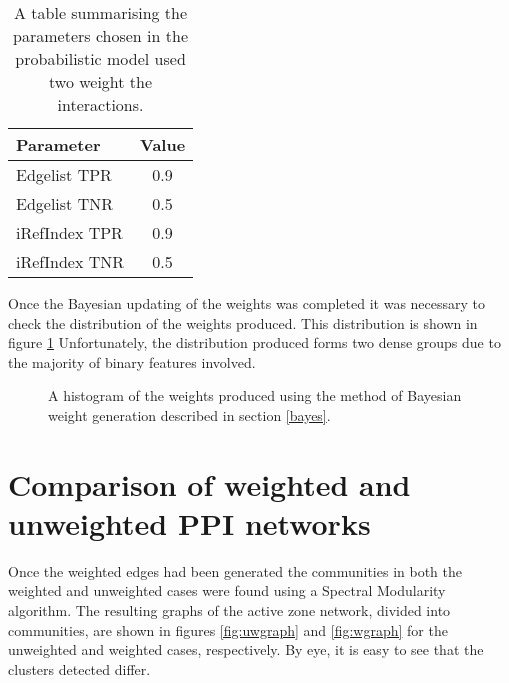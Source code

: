\begin{table}
    \centering
    \begin{tabular}{l c }
        Parameter       & Value \\
        \hline
        Edgelist TPR    & 0.9 \\
        Edgelist TNR    & 0.5 \\
        iRefIndex TPR   & 0.9 \\
        iRefIndex TNR   & 0.5 \\
    \end{tabular}
    \caption{A table summarising the parameters chosen in the probabilistic model used two weight the interactions.}
    \label{tab:estimates}
\end{table}

Once the Bayesian updating of the weights was completed it was necessary to check the distribution of the weights produced.
This distribution is shown in figure \ref{fig:weightdist}
Unfortunately, the distribution produced forms two dense groups due to the majority of binary features involved.

\begin{figure}
    \centering
    \setlength\figureheight{3in}
    \setlength\figurewidth{4in}
    \caption{A histogram of the weights produced using the method of Bayesian weight generation described in section \ref{bayes}.}
    \label{fig:weightdist}
\end{figure}


\section{Comparison of weighted and unweighted PPI networks}

Once the weighted edges had been generated the communities in both the weighted and unweighted cases were found using a Spectral Modularity algorithm.
The resulting graphs of the active zone network, divided into communities, are shown in figures \ref{fig:uwgraph} and \ref{fig:wgraph} for the unweighted and weighted cases, respectively.
By eye, it is easy to see that the clusters detected differ.

